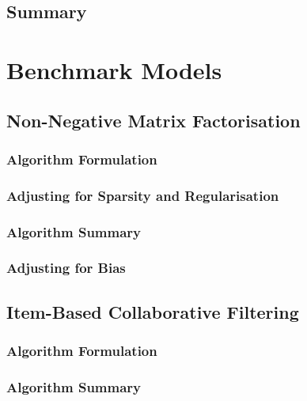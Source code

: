 \subsection{Summary}
\label{sec:Summary for NCF}

\section{Benchmark Models}
\label{sec:Benchmark Models}

\subsection{Non-Negative Matrix Factorisation}
\label{subsec:Non-Negative Matrix Factorisation}

\subsubsection{Algorithm Formulation}
\label{subsubsec:Algorithm Formulation}

\subsubsection{Adjusting for Sparsity and Regularisation}
\label{subsubsec:Adjusting for Sparsity and Regularisation}


\subsubsection{Algorithm Summary}
\label{subsubsec:Algorithm Summary}



\subsubsection{Adjusting for Bias}
\label{subsubsec:Adjusting for Bias}


\subsection{Item-Based Collaborative Filtering}
\label{subsec:Item-Based Collaborative Filtering}


\subsubsection{Algorithm Formulation}
\label{subsubsec:Algorithm Formulation}

\subsubsection{Algorithm Summary}
\label{subsubsec:Algorithm Summary}


